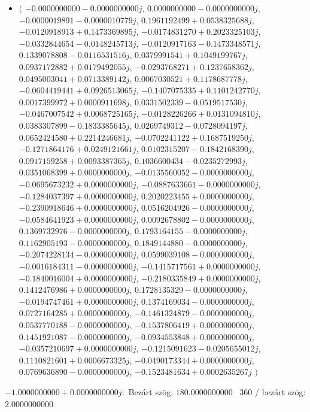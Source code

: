 \documentclass[14pt,a4paper]{article}
\begin{document}
\begin{itemize}
\item
$\big($
$-0.0000000000-0.0000000000j$, $0.0000000000-0.0000000000j$, $-0.0000019891-0.0000010779j$, $0.1961192499+0.0538325688j$, $-0.0120918913+0.1473369895j$, $-0.0174831270+0.2023325103j$, $-0.0332844654-0.0148245713j$, $-0.0120917163-0.1473348571j$, $0.1339078808-0.0116531516j$, $0.0379991541+0.1049199767j$, $0.0937172882+0.0179492055j$, $-0.0293768271+0.1237658362j$, $0.0495003041+0.0713389142j$, $0.0067030521+0.1178687778j$, $-0.0604419441+0.0926513065j$, $-0.1407075335+0.1101242770j$, $0.0017399972+0.0000911698j$, $0.0331502339-0.0519517530j$, $-0.0467007542+0.0068725165j$, $-0.0128226266+0.0131094810j$, $0.0383307899-0.1833385645j$, $0.0269749312-0.0728094197j$, $0.0652424580+0.2214246681j$, $-0.0702241122+0.1687519250j$, $-0.1271864176+0.0249121661j$, $0.0102315207-0.1842168390j$, $0.0917159258+0.0093387365j$, $0.1036600434-0.0235272993j$, $0.0351068399+0.0000000000j$, $-0.0135560052-0.0000000000j$, $-0.0695673232+0.0000000000j$, $-0.0887633661-0.0000000000j$, $-0.1284037397+0.0000000000j$, $0.2020223455+0.0000000000j$, $-0.2390918646+0.0000000000j$, $0.0516204926-0.0000000000j$, $-0.0584641923+0.0000000000j$, $0.0092678802-0.0000000000j$, $0.1369732976-0.0000000000j$, $0.1793164155-0.0000000000j$, $0.1162905193-0.0000000000j$, $0.1849144880-0.0000000000j$, $-0.2074228134-0.0000000000j$, $0.0599039108-0.0000000000j$, $-0.0016184311-0.0000000000j$, $-0.1415717561+0.0000000000j$, $-0.1840016004+0.0000000000j$, $-0.2180335849+0.0000000000j$, $0.1412476986+0.0000000000j$, $0.1728135329-0.0000000000j$, $-0.0194747461+0.0000000000j$, $0.1374169034-0.0000000000j$, $0.0727164285+0.0000000000j$, $-0.1461324879-0.0000000000j$, $0.0537770188-0.0000000000j$, $-0.1537806419+0.0000000000j$, $0.1451921087-0.0000000000j$, $-0.0934553848+0.0000000000j$, $-0.0357210697+0.0000000000j$, $-0.1215091623-0.0205655012j$, $0.1110821601+0.0006673325j$, $-0.0490173344+0.0000000000j$, $0.0769636890-0.0000000000j$, $-0.1523481634+0.0002635267j$
$\big)$
\end{itemize}
$-1.0000000000+0.0000000000j$:\
Bezárt szög: $180.0000000000$ \
360 / bezárt szög: $2.0000000000$\
\end{document}
